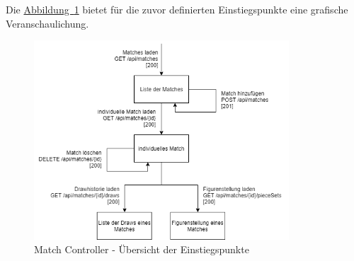 Die \hyperref[fig:matchController]{Abbildung~\ref{fig:matchController}} bietet für die zuvor definierten Einstiegspunkte eine grafische Veranschaulichung.\\
\begin{figure}[htb]
	\includegraphics[width=0.85\textwidth]{images/match-controller.png}
	\caption{Match Controller - Übersicht der Einstiegspunkte}
	\label{fig:matchController}
\end{figure}

